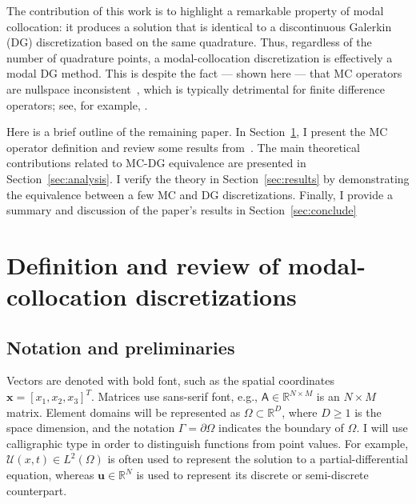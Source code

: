 \documentclass[pdflatex,sn-mathphys-num]{sn-jnl}%
\theoremstyle{thmstyleone}%
\theoremstyle{thmstyletwo}%
\theoremstyle{thmstylethree}%
\newcommand{\mat}[1]{\ensuremath{\mathsf{#1}}}
\newcommand{\fnc}[1]{\ensuremath{\mathcal{#1}}}
\begin{document}
The contribution of this work is to highlight a remarkable property of modal collocation: it produces a solution that is identical to a discontinuous Galerkin (DG) discretization based on the same quadrature.  Thus, regardless of the number of quadrature points, a modal-collocation discretization is effectively a modal DG method.  This is despite the fact --- shown here --- that MC operators are nullspace inconsistent~\cite{Svard2019convergence}, which is typically detrimental for finite difference operators; see, for example, \cite{Glaubitz2026SBPnotenough}.

Here is a brief outline of the remaining paper.  In Section~\ref{sec:methods}, I present the MC operator definition and review some results from~\cite{Chan2018discretely}.  The main theoretical contributions related to MC-DG equivalence are presented in Section~\ref{sec:analysis}.  I verify the theory in Section~\ref{sec:results} by demonstrating the equivalence between a few MC and DG discretizations.  Finally, I provide a summary and discussion of the paper's results in Section~\ref{sec:conclude}

\section{Definition and review of modal-collocation discretizations}\label{sec:methods}


\subsection{Notation and preliminaries}\label{sec:prelim}



Vectors are denoted with bold font, such as the spatial coordinates $\bm{x} = [x_1,x_2,x_3]^T$.  Matrices use sans-serif font, e.g., $\mat{A} \in \mathbb{R}^{N \times M}$ is an $N \times M$ matrix.  Element domains will be represented as $\Omega \subset \mathbb{R}^{D}$, where $D \geq 1$ is the space dimension, and the notation $\Gamma = \partial \Omega$ indicates the boundary of $\Omega$. I will use calligraphic type in order to distinguish functions from point values.  For example, $\fnc{U}(x,t) \in L^2(\Omega)$ is often used to represent the solution to a partial-differential equation, whereas $\bm{u} \in \mathbb{R}^N$ is used to represent its discrete or semi-discrete counterpart.
\end{document}
